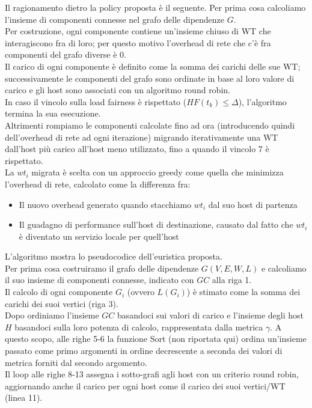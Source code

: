 \documentclass[11pt]{article}
\begin{document}
		Il ragionamento dietro la policy proposta è il seguente.
		Per prima cosa calcoliamo l'insieme di componenti connesse nel grafo delle dipendenze $G$. \\
		Per costruzione, ogni componente contiene un'insieme chiuso di WT che interagiscono fra di loro; per questo motivo l'overhead di rete che c'è fra componenti del grafo diverse è 0. \\
		Il carico di ogni componente è definito come la somma dei carichi delle sue WT; successivamente le componenti del grafo sono ordinate in base al loro valore di carico e gli host sono associati con un algoritmo round robin. \\
		In caso il vincolo  sulla load fairness è rispettato ($HF(t_k) \le \Delta$), l'algoritmo termina la sua esecuzione. \\
		Altrimenti rompiamo le componenti calcolate fino ad ora (introducendo quindi dell'overhead di rete ad ogni iterazione) migrando iterativamente una WT dall'host più carico all'host meno utilizzato, fino a quando il vincolo 7 è rispettato. \\
		La $wt_i$ migrata è scelta con un approccio greedy come quella che minimizza l'overhead di rete, calcolato come la differenza fra:
		\begin{itemize}
			\item Il nuovo overhead generato quando stacchiamo $wt_i$ dal suo host di partenza
			\item Il guadagno di performance sull'host di destinazione, causato dal fatto che $wt_i$ è diventato un servizio locale per quell'host
		\end{itemize}
		L'algoritmo mostra lo pseudocodice dell'euristica proposta. \\
		Per prima cosa costruiramo il grafo delle dipendenze $G(V, E, W, L)$ e calcoliamo il suo insieme di componenti connesse, indicato con $GC$ alla riga 1. \\
		Il calcolo di ogni componente $G_i$ (ovvero $L(G_i)$) è stimato come la somma dei carichi dei suoi vertici (riga 3).\\
		Dopo ordiniamo l'insieme $GC$ basandoci sui valori di carico e l'insieme degli host $H$ basandoci sulla loro potenza di calcolo, rappresentata dalla metrica $\gamma$. A questo scopo, alle righe 5-6 la funzione Sort (non riportata qui) ordina un'insieme passato come primo argomenti in ordine decrescente a seconda dei valori di metrica forniti dal secondo argomento. \\
		Il loop alle righe 8-13 assegna i sotto-grafi agli host con un criterio round robin, aggiornando anche il carico per ogni host come il carico dei suoi vertici/WT (linea 11). \\
\end{document}
